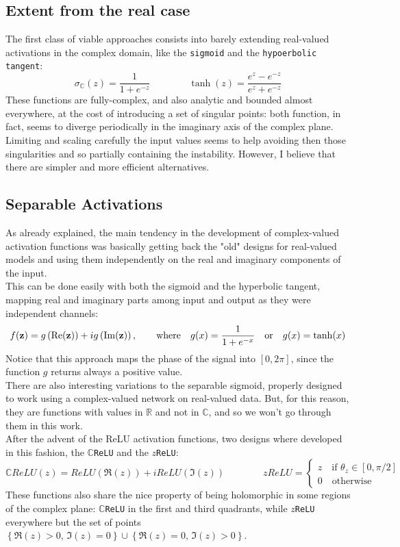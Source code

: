 \documentclass[../main.tex]{subfiles}
\begin{document}
\subsection*{Extent from the real case}
The first class of viable approaches consists into barely extending real-valued activations in the complex domain, like the \texttt{sigmoid} and the \texttt{hypoerbolic tangent}:
\[ \sigma_\mathds{C}(z) = \frac{1}{1+e^{-z}}  \qquad\qquad \tanh(z) = \frac{e^z - e^{-z}}{e^z + e^{-z}} \]
These functions are fully-complex, and also analytic and bounded almost everywhere, at the cost of introducing a set of singular points: both function, in fact, seems to diverge periodically in the imaginary axis of the complex plane. Limiting and scaling carefully the input values seems to help avoiding then those singularities and so partially containing the instability. However, I believe that there are simpler and more efficient alternatives.

\subsection*{Separable Activations}
As already explained, the main tendency in the development of complex-valued activation functions was basically getting back the "old" designs for real-valued models and using them independently on the real and imaginary components of the input.\\
This can be done easily with both the sigmoid and the hyperbolic tangent, mapping real and imaginary parts among input and output as they were independent channels:
\[ f(\vb{z}) = g\left(\Re(\vb{z})\right) + ig\left(\Im(\vb{z})\right), \qquad\text{where}\quad g(x) = \frac{1}{1+e^{-x}} \quad\text{or}\quad g(x)=\tanh(x) \]
Notice that this approach maps the phase of the signal into $[0,2\pi]$, since the function $g$ returns always a positive value.\\
There are also interesting variations to the separable sigmoid, properly designed to work using a complex-valued network on real-valued data. But, for this reason, they are functions with values in $\mathds{R}$ and not in $\mathds{C}$, and so we won't go through them in this work.\\
After the advent of the ReLU activation functions, two designs where developed in this fashion, the \texttt{$\mathds{C}$ReLU} and the \texttt{$z$ReLU}:
\[ \mathds{C}ReLU(z) = ReLU(\Re(z)) + iReLU(\Im(z)) \qquad\qquad zReLU = \begin{cases} z\quad \text{if } \theta_z\in[0,\pi/2] \\ 0\quad\text{otherwise} \end{cases} \]
These functions also share the nice property of being holomorphic in some regions of the complex plane: \texttt{$\mathds{C}$ReLU} in the first and third quadrants, while \texttt{$z$ReLU} everywhere but the set of points $\left\{\Re(z)>0,\, \Im(z)=0\right\} \cup \left\{\Re(z)=0,\, \Im(z)>0\right\}$.
\end{document}
